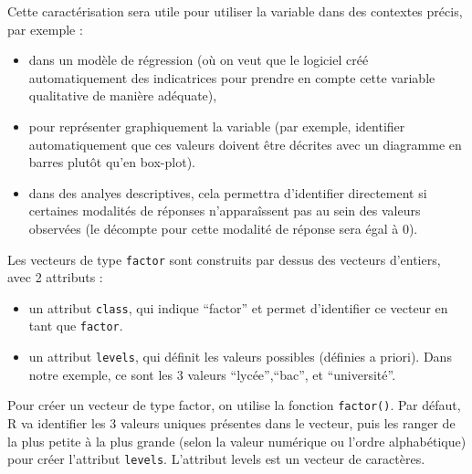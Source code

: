 \documentclass[
]{book}
\providecommand{\tightlist}{%
  \setlength{\itemsep}{0pt}\setlength{\parskip}{0pt}}
\begin{document}
Cette caractérisation sera utile pour utiliser la variable dans des contextes précis, par exemple :

\begin{itemize}
\tightlist
\item
  dans un modèle de régression (où on veut que le logiciel créé automatiquement des indicatrices pour prendre en compte cette variable qualitative de manière adéquate),
\item
  pour représenter graphiquement la variable (par exemple, identifier automatiquement que ces valeurs doivent être décrites avec un diagramme en barres plutôt qu'en box-plot).
\item
  dans des analyes descriptives, cela permettra d'identifier directement si certaines modalités de réponses n'apparaîssent pas au sein des valeurs observées (le décompte pour cette modalité de réponse sera égal à 0).
\end{itemize}

Les vecteurs de type \texttt{factor} sont construits par dessus des vecteurs d'entiers, avec 2 attributs :

\begin{itemize}
\tightlist
\item
  un attribut \texttt{class}, qui indique ``factor'' et permet d'identifier ce vecteur en tant que \texttt{factor}.
\item
  un attribut \texttt{levels}, qui définit les valeurs possibles (définies a priori). Dans notre exemple, ce sont les 3 valeurs ``lycée'',``bac'', et ``université''.
\end{itemize}

Pour créer un vecteur de type factor, on utilise la fonction \texttt{factor()}. Par défaut, R va identifier les 3 valeurs uniques présentes dans le vecteur, puis les ranger de la plus petite à la plus grande (selon la valeur numérique ou l'ordre alphabétique) pour créer l'attribut \texttt{levels}. L'attribut levels est un vecteur de caractères.
\end{document}
